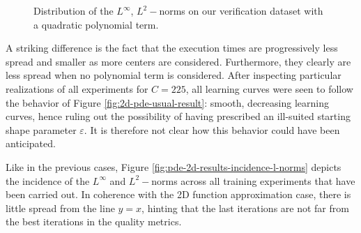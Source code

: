 \documentclass[12pt]{report} %
\begin{document}
\begin{figure}
\begin{tabular}{cccccc}
  \end{tabular}
  \caption{Distribution of the $L^\infty$, $L^2-$norms on our verification dataset
    with a quadratic polynomial term.}
  \label{fig:2d-pde-parabola-results-poly2}
\end{figure}


A striking difference is the fact that the execution times are progressively less spread and smaller as more centers are considered. Furthermore, they clearly are less spread when no polynomial term is considered. After inspecting particular realizations of all experiments for $C=225$, all learning curves were seen to follow the behavior of Figure \ref{fig:2d-pde-usual-result}: smooth, decreasing learning curves, hence ruling out the possibility of having prescribed an ill-suited starting shape parameter $\varepsilon$. It is therefore not clear how this behavior could have been anticipated.

Like in the previous cases, Figure \ref{fig:pde-2d-results-incidence-l-norms} depicts the incidence of the $L^\infty$ and $L^2-$norms across all training experiments that have been carried out. In coherence with the 2D function approximation case, there is little spread from the line $y=x$, hinting that the last iterations are not far from the best iterations in the quality metrics.
\end{document}
